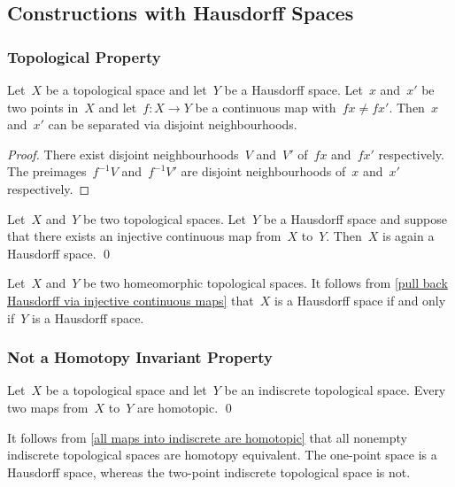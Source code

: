 \subsection{Constructions with Hausdorff Spaces}



\subsubsection{Topological Property}

\begin{lemma}
	\label{separating two points with map into a hausdorff space}
	Let~$X$ be a topological space and let~$Y$ be a Hausdorff space.
	Let~$x$ and~$x'$ be two points in~$X$ and let~$f \colon X \to Y$ be a continuous map with~$f x ≠ f x'$.
	Then~$x$ and~$x'$ can be separated via disjoint neighbourhoods.
\end{lemma}

\begin{proof}
	There exist disjoint neighbourhoods~$V$ and~$V'$ of~$f x$ and~$f x'$ respectively.
	The preimages~$f^{-1} V$ and~$f^{-1} V'$ are disjoint neighbourhoods of~$x$ and~$x'$ respectively.
\end{proof}

\begin{proposition}
	\label{pull back Hausdorff via injective continuous maps}
	Let~$X$ and~$Y$ be two topological spaces.
	Let~$Y$ be a Hausdorff space and suppose that there exists an injective continuous map from~$X$ to~$Y$.
	Then~$X$ is again a Hausdorff space.
	\qed
\end{proposition}

Let~$X$ and~$Y$ be two homeomorphic topological spaces.
It follows from \cref{pull back Hausdorff via injective continuous maps} that~$X$ is a Hausdorff space if and only if~$Y$ is a Hausdorff space.



\subsubsection{Not a Homotopy Invariant Property}

\begin{lemma}
	\label{all maps into indiscrete are homotopic}
	Let~$X$ be a topological space and let~$Y$ be an indiscrete topological space.
	Every two maps from~$X$ to~$Y$ are homotopic.
	\qed
\end{lemma}

It follows from \cref{all maps into indiscrete are homotopic} that all nonempty indiscrete topological spaces are homotopy equivalent.
The one-point space is a Hausdorff space, whereas the two-point indiscrete topological space is not.



